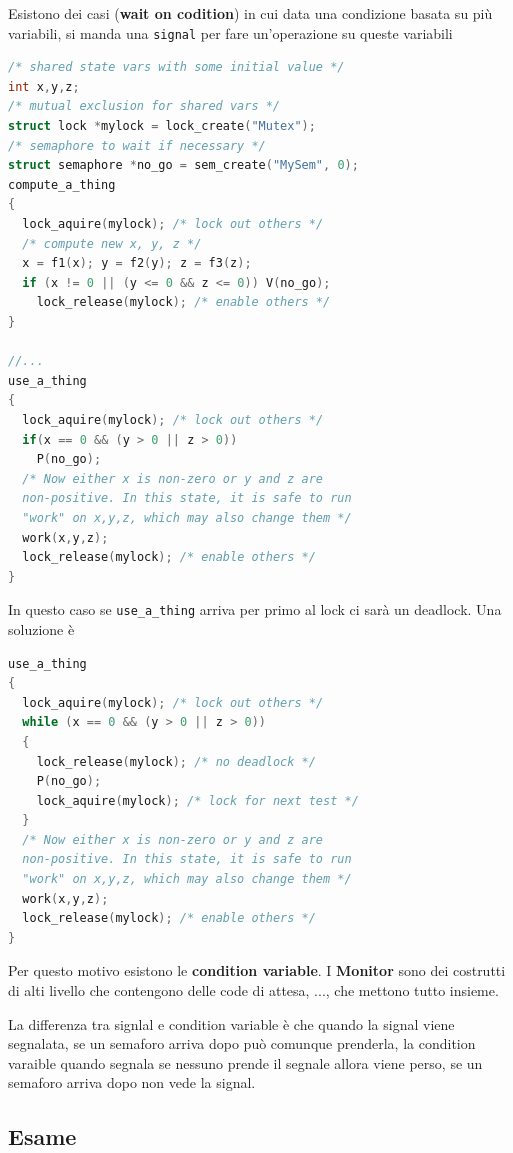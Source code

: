 \documentclass[12pt]{article}
\begin{document}
Esistono dei casi (\textbf{wait on codition}) in cui data una condizione basata su pi\`u variabili, si manda una \texttt{signal} per fare un'operazione su queste variabili
\begin{lstlisting}[language=c]
/* shared state vars with some initial value */
int x,y,z;
/* mutual exclusion for shared vars */
struct lock *mylock = lock_create("Mutex");
/* semaphore to wait if necessary */
struct semaphore *no_go = sem_create("MySem", 0);
compute_a_thing
{
  lock_aquire(mylock); /* lock out others */
  /* compute new x, y, z */
  x = f1(x); y = f2(y); z = f3(z);
  if (x != 0 || (y <= 0 && z <= 0)) V(no_go);
    lock_release(mylock); /* enable others */
}

//...
use_a_thing
{
  lock_aquire(mylock); /* lock out others */
  if(x == 0 && (y > 0 || z > 0))
    P(no_go);
  /* Now either x is non-zero or y and z are
  non-positive. In this state, it is safe to run
  "work" on x,y,z, which may also change them */
  work(x,y,z);
  lock_release(mylock); /* enable others */
}
\end{lstlisting}
In questo caso se \texttt{use\_a\_thing} arriva per primo al lock ci sar\`a un deadlock. Una soluzione \`e
\begin{lstlisting}[language=c]
use_a_thing 
{
  lock_aquire(mylock); /* lock out others */
  while (x == 0 && (y > 0 || z > 0)) 
  {
    lock_release(mylock); /* no deadlock */
    P(no_go);
    lock_aquire(mylock); /* lock for next test */
  }
  /* Now either x is non-zero or y and z are
  non-positive. In this state, it is safe to run
  "work" on x,y,z, which may also change them */
  work(x,y,z);
  lock_release(mylock); /* enable others */
}
\end{lstlisting}
Per questo motivo esistono le \textbf{condition variable}. I \textbf{Monitor} sono dei costrutti di alti livello che contengono delle code di attesa, ..., che mettono tutto insieme.

La differenza tra signlal e condition variable \`e che quando la signal viene segnalata, se un semaforo arriva dopo pu\`o comunque prenderla, la condition varaible quando segnala se nessuno prende il segnale allora viene perso, se un semaforo arriva dopo non vede la signal.




\subsection{Esame}
\end{document}
